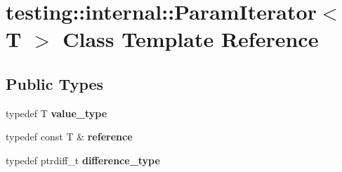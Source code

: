 \hypertarget{classtesting_1_1internal_1_1ParamIterator}{}\section{testing\+:\+:internal\+:\+:Param\+Iterator$<$ T $>$ Class Template Reference}
\label{classtesting_1_1internal_1_1ParamIterator}
\subsection*{Public Types}
\begin{DoxyCompactItemize}
\item 
\mbox{\label{classtesting_1_1internal_1_1ParamIterator_a4afe3a68db0d0744753c8afe262e35df}} 
typedef T {\bfseries value\+\_\+type}
\item 
\mbox{\label{classtesting_1_1internal_1_1ParamIterator_ac96f133ffa06fc0f9faff5a1c7954382}} 
typedef const T \& {\bfseries reference}
\item 
\mbox{\label{classtesting_1_1internal_1_1ParamIterator_a6c37240a04ba3fc4c56f6c413cf4771d}} 
typedef ptrdiff\+\_\+t {\bfseries difference\+\_\+type}
\end{DoxyCompactItemize}

